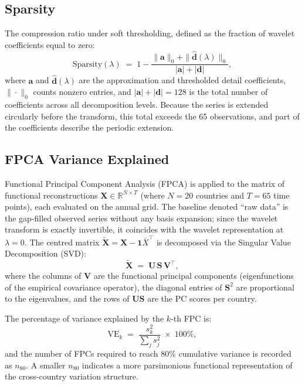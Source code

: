 \subsection{Sparsity}
\label{subsec:sparsity_metric}

The compression ratio under soft thresholding, defined as the fraction of wavelet
coefficients equal to zero:
\begin{equation}
    \mathrm{Sparsity}(\lambda)
    \;=\;
    1 - \frac{\|\mathbf{a}\|_0 + \|\hat{\mathbf{d}}(\lambda)\|_0}
             {|\mathbf{a}| + |\mathbf{d}|},
    \label{eq:sparsity}
\end{equation}
where $\mathbf{a}$ and $\hat{\mathbf{d}}(\lambda)$ are the approximation and
thresholded detail coefficients, $\|\cdot\|_0$ counts nonzero entries, and
$|\mathbf{a}| + |\mathbf{d}| = 128$ is the total number of coefficients across
all decomposition levels. Because the series is extended circularly before the
transform, this total exceeds the 65 observations, and part of the coefficients
describe the periodic extension.

\subsection{FPCA Variance Explained}
\label{subsec:fpca_metric}

Functional Principal Component Analysis (FPCA) is applied to the matrix of
functional reconstructions $\mathbf{X} \in \mathbb{R}^{N \times T}$
(where $N = 20$ countries and $T = 65$ time points), each evaluated on the
annual grid. The baseline denoted ``raw data'' is the gap-filled observed
series without any basis expansion; since the wavelet transform is exactly
invertible, it coincides with the wavelet representation at $\lambda = 0$. The centred matrix
$\widetilde{\mathbf{X}} = \mathbf{X} - \mathbf{1}\bar{X}^{\!\top}$ is
decomposed via the Singular Value Decomposition (SVD):
\begin{equation}
    \widetilde{\mathbf{X}} \;=\; \mathbf{U}\,\mathbf{S}\,\mathbf{V}^{\!\top},
    \label{eq:svd}
\end{equation}
where the columns of $\mathbf{V}$ are the functional principal components
(eigenfunctions of the empirical covariance operator), the diagonal entries of
$\mathbf{S}^2$ are proportional to the eigenvalues, and the rows of
$\mathbf{U}\mathbf{S}$ are the PC scores per country.

The percentage of variance explained by the $k$-th FPC is:
\begin{equation}
    \mathrm{VE}_k
    \;=\;
    \frac{s_k^2}{\displaystyle\sum_{j} s_j^2}
    \;\times\; 100\%,
    \label{eq:var_explained}
\end{equation}
and the number of FPCs required to reach 80\% cumulative variance is recorded
as $n_{80}$. A smaller $n_{80}$ indicates a more parsimonious functional
representation of the cross-country variation structure.

